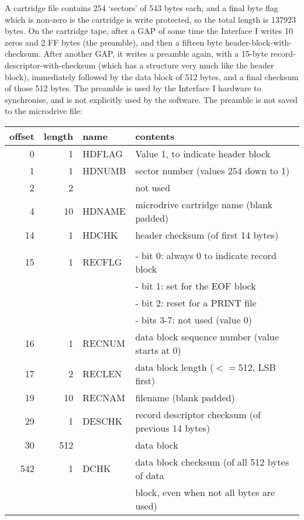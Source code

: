     A cartridge file contains 254 `sectors' of 543 bytes each, and a final
    byte flag which is non-zero is the cartridge is write protected, so the
    total length is 137923 bytes.  On the cartridge tape, after a GAP of
    some time the Interface I writes 10 zeros and 2 FF bytes (the preamble),
    and then a fifteen byte header-block-with-checksum.  After another GAP,
    it writes a preamble again, with a 15-byte record-
    descriptor-with-checksum (which has a structure very much like the
    header block), immediately followed by the data block of 512 bytes, and
    a final checksum of those 512 bytes.  The preamble is used by the
    Interface I hardware to synchronise, and is not explicitly used by the
    software.  The preamble is not saved to the microdrive file:\\

\begin{tabular}{|r|r|l|l|}
    \hline
    offset & length & name &  contents \\
    \hline
    \hline
      0  &    1 &  HDFLAG &  Value 1, to indicate header block		\\
      1  &    1 &  HDNUMB &  sector number (values 254 down to 1)	\\
      2  &    2 &         &  not used					\\
      4  &   10 &  HDNAME &  microdrive cartridge name (blank padded)	\\
     14  &    1 &  HDCHK  &  header checksum (of first 14 bytes)	\\
         &      &         & \\
     15  &    1 &  RECFLG &  - bit 0: always 0 to indicate record block	\\
         &      &         &  - bit 1: set for the EOF block		\\
         &      &         &  - bit 2: reset for a PRINT file		\\
         &      &         &  - bits 3-7: not used (value 0)		\\
     16  &    1 &  RECNUM &  data block sequence number (value starts at 0) \\
     17  &    2 &  RECLEN &  data block length ($<=$512, LSB first)	\\
     19  &   10 &  RECNAM &  filename (blank padded)			\\
     29  &    1 &  DESCHK & record descriptor checksum (of previous 14 bytes)\\
     30  &  512 &         &  data block					\\
    542  &    1 &  DCHK   &  data block checksum (of all 512 bytes of data \\
         &      &         &  block, even when not all bytes are used) \\
    \hline
\end{tabular}

